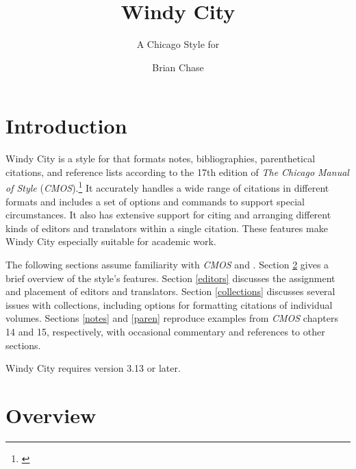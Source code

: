 \documentclass[11pt,letterpaper,oneside]{article}
\begin{document}
\title{Windy City}
\subtitle{A Chicago Style for \texttt{\biblatex}}
\author{Brian Chase}
\maketitle
\begingroup
\hypersetup{linkcolor=black}
\tableofcontents{}
\endgroup

\section{Introduction}


Windy City is a style for \biblatex that formats notes,
bibliographies, parenthetical citations, and reference lists according
to the 17th edition of \textit{The Chicago Manual of Style}
(\textit{CMOS}).\footnote{\cite{chicago2017}} It accurately handles a
wide range of citations in different formats and includes a set of
options and commands to support special circumstances. It also has
extensive support for citing and arranging different kinds of editors
and translators within a single citation. These features make Windy
City especially suitable for academic work.

The following sections assume familiarity with \textit{CMOS} and
\biblatex. Section \ref{overview} gives a brief overview of the
style's features. Section \ref{editors} discusses the assignment and
placement of editors and translators. Section \ref{collections}
discusses several issues with collections, including options for
formatting citations of individual volumes. Sections \ref{notes} and
\ref{paren} reproduce examples from \textit{CMOS} chapters 14 and 15,
respectively, with occasional commentary and references to other
sections.

Windy City requires \biblatex version 3.13 or later.

\section{Overview}
\label{overview}
\end{document}
